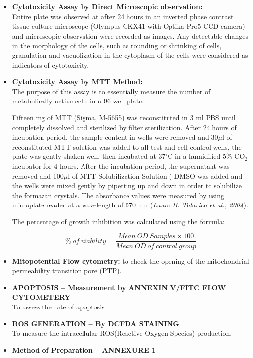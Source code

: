 \documentclass[11pt]{article} %
\begin{document}
\begin{itemize}
	\item \textbf{Cytotoxicity Assay by Direct Microscopic observation:} \\
	Entire plate was observed at after 24 hours in an inverted phase contrast tissue culture microscope (Olympus CKX41 with Optika Pro5 CCD camera) and microscopic observation were recorded as images.  Any detectable changes in the morphology of the cells, such as rounding or shrinking of cells, granulation and vacuolization in the cytoplasm of the cells were considered as indicators of cytotoxicity.  
	\item \textbf{Cytotoxicity Assay by MTT Method:} \\
	The purpose of this assay is to essentially measure the number of metabolically active cells in a 96-well plate.
	
	Fifteen mg of MTT (Sigma, M-5655) was reconstituted in 3 ml PBS until completely dissolved and sterilized by filter sterilization. After 24  hours of incubation period, the sample content in wells were removed and 30$\mu$l of reconstituted MTT solution was added to all test and cell control wells, the plate was gently shaken well, then incubated at 37$^{\circ}$C in a humidified 5\% CO$_2 $ incubator for 4 hours. After the incubation period, the supernatant was removed and 100$\mu$l of MTT Solubilization Solution ( DMSO was added and the wells were mixed gently by pipetting up and down  in order to solubilize the formazan crystals. The absorbance values were measured by using microplate reader at a wavelength of 570 nm (\textit{Laura B. Talarico et al., 2004}).
	
	The percentage of growth inhibition was calculated using the formula:
	
	\begin{equation}
	\label{eqn:viability}
	\%\ of\ viability = \frac{Mean\ OD\ Samples \times 100}{Mean\ OD\ of\ control\ group}
	\end{equation}
	
	\item \textbf{Mitopotential Flow cytometry:} to check the opening of the mitochondrial permeability transition pore (PTP).
	\item \textbf{APOPTOSIS – Measurement by ANNEXIN V/FITC FLOW CYTOMETERY} \\
	To assess the rate of apoptosis
	\item \textbf{ROS GENERATION – By DCFDA STAINING} \\
	To measure the intracellular ROS(Reactive Oxygen Species) production.
	\item \textbf{Method of Preparation – ANNEXURE 1}
\end{itemize}
\end{document}
